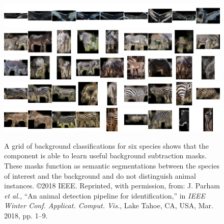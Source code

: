 \begin{figure}[!t]
\begin{center}
        \vspace{-0.040cm}
        \includegraphics[width=0.78\linewidth]{resources/samples-image-whale_fluke2.pdf} \\
        \vspace{-0.040cm}
        \includegraphics[width=0.78\linewidth]{resources/samples-image-zebra_grevys.pdf} \\
        \vspace{0.040cm}
        \includegraphics[width=0.78\linewidth]{resources/samples-image-zebra_grevys2.pdf} \\
        \vspace{0.040cm}
        \includegraphics[width=0.78\linewidth]{resources/samples-image-zebra_plains.pdf} \\
        \vspace{0.040cm}
        \includegraphics[width=0.78\linewidth]{resources/samples-image-zebra_plains2.pdf}
    \end{center}
    \caption{A grid of background classifications for six species shows that the component is able to learn useful background subtraction masks.  These masks function as semantic segmentations between the species of interest and the background and do not distinguish animal instances.  \copyright 2018 IEEE. Reprinted, with permission, from: J. Parham \textit{et al.}, ``An animal detection pipeline for identification,'' in \textit{IEEE Winter Conf. Applicat. Comput. Vis.}, Lake Tahoe, CA, USA, Mar. 2018, pp. 1–9.}
    \label{fig:background}
\end{figure}

